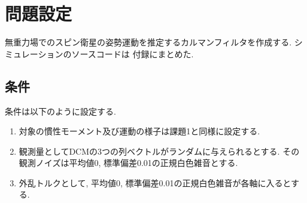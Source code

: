 \documentclass[class=article, crop=false, dvipdfmx, fleqn]{standalone}
\begin{document}
\section{問題設定}
無重力場でのスピン衛星の姿勢運動を推定するカルマンフィルタを作成する. シミュレーションのソースコードは
付録にまとめた.

\subsection{条件}
条件は以下のように設定する.
\begin{enumerate}
  \item 対象の慣性モーメント及び運動の様子は課題1と同様に設定する.
  \item 観測量としてDCMの3つの列ベクトルがランダムに与えられるとする. その観測ノイズは平均値0,
  標準偏差0.01の正規白色雑音とする.
  \item 外乱トルクとして, 平均値0, 標準偏差0.01の正規白色雑音が各軸に入るとする.
\end{enumerate}
\end{document}

